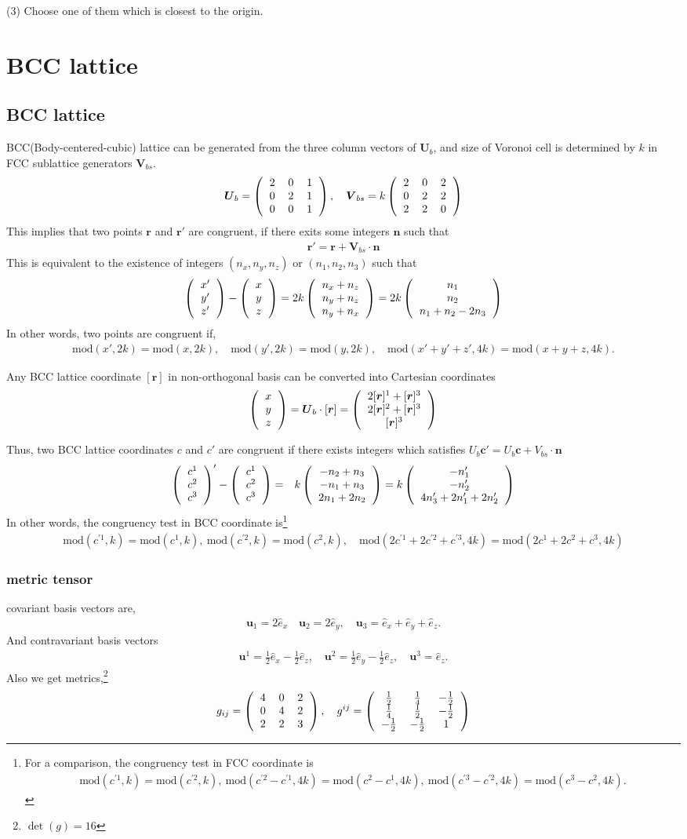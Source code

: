 \documentclass[10pt]{book}
\def\bm{\boldsymbol}
\newcommand{\bea}{\begin{eqnarray}}
\newcommand{\eea}{\end{eqnarray}}
\def\vr{{\bm r}}
\newcommand{\colmthr}[3]
{\left(\begin{tabular}{c} {$#1$}\\{$#2$}\\{$#3$}\end{tabular}\right)}
\newcommand{\threedmat}[9]
{\left(\begin{tabular}{ccc} {$#1$}&{$#2$}&{$#3$} \\
		{$#4$}&{$#5$}&{$#6$}\\
		{$#7$}&{$#8$}&{$#9$}\\
	    \end{tabular}\right)}
\begin{document}
(3) Choose one of them which is closest to the origin. 
 
\chapter{BCC lattice} 

\section{BCC lattice} 
BCC(Body-centered-cubic) lattice 
can be generated from the three column vectors of ${\bm U}_b$, 
and size of Voronoi cell is determined by $k$ in
FCC sublattice generators ${\bm V}_{bs}$.
\bea       
{\bm U}_b=\threedmat{2}{0}{1}{0}{2}{1}{0}{0}{1},\quad {\bm V}_{bs}=k\threedmat{2}{0}{2}{0}{2}{2}{2}{2}{0}
\eea 
This implies that two points 
$\vr$ and $\vr'$ are congruent, 
if there exits some integers ${\bm n}$ such that
\bea 
\vr'=\vr+{\bm V}_{bs}\cdot {\bm n}
\eea 
This is equivalent to the existence of integers $(n_x,n_y,n_z)$ or  $(n_1,n_2,n_3)$ such that 
\bea 
\colmthr{x'}{y'}{z'}-\colmthr{x}{y}{z}= 2k \colmthr{n_x+n_z}{n_y+n_z}{n_y+n_x}=
2k \colmthr{n_1}{n_2}{n_1+n_2-2 n_3}
\eea 
In other words, two points are congruent if,
\bea 
\mbox{mod}(x',2k)=\mbox{mod}(x,2k),\quad 
\mbox{mod}(y',2k)=\mbox{mod}(y,2k),\quad 
\mbox{mod}(x'+y'+z',4k)=\mbox{mod}(x+y+z,4k).\nonumber  
\eea 

Any BCC lattice coordinate $[\vr]$ in non-orthogonal basis
can be converted into Cartesian coordinates 
\bea 
\colmthr{x}{y}{z}={\bm U}_b\cdot[\vr]=\colmthr{2[\vr]^1+[\vr]^3}{2[\vr]^2+[\vr]^3}{[\vr]^3}
\eea 

Thus, two BCC lattice coordinates $c$ and $c'$ are 
	congruent if there exists integers which satisfies
	$U_b{\bm c}'=U_b{\bm c}+V_{bs}\cdot {\bm n}$
	\bea 
	\colmthr{c^1}{c^2}{c^3}'-\colmthr{c^1}{c^2}{c^3} &=& k \colmthr{-n_2+n_3 }{-n_1+n_3 }{2n_1+2n_2 }
	=k \colmthr{-n'_1}{-n'_2}{4n'_3+2n'_1+2n'_2}
	\eea 
	In other words, the congruency test in BCC coordinate is\footnote{ 
		For a comparison, the congruency test in FCC coordinate is
		\bea 
		\mbox{mod}(c^{'1},k)=\mbox{mod}(c^{'2},k),\
		\mbox{mod}(c^{'2}-c^{'1},4k)=\mbox{mod}(c^{2}-c^{1},4k),\
		\mbox{mod}(c^{'3}-c^{'2},4k)=\mbox{mod}(c^{3}-c^{2},4k).
		\eea 
	} 
	\bea 
	\mbox{mod}(c^{'1},k)=\mbox{mod}(c^1,k),\ 
	\mbox{mod}(c^{'2},k)=\mbox{mod}(c^2,k),\quad 
	\mbox{mod}(2c^{'1}+2c^{'2}+c^{'3},4k)=\mbox{mod}(2c^1+2c^2+c^3,4k) \nonumber 
	\eea  

\subsection{metric tensor} 
covariant basis vectors are, 
\bea 
{\bm u}_1=2\hat{e}_x \quad 
{\bm u}_2=2\hat{e}_y ,\quad
{\bm u}_3= \hat{e}_x+\hat{e}_y+\hat{e}_z.
\eea 
And contravariant basis vectors
\bea 
{\bm u}^1=\frac{1}{2}\hat{e}_x-\frac{1}{2}\hat{e}_z,\quad 
{\bm u}^2=\frac{1}{2}\hat{e}_y-\frac{1}{2}\hat{e}_z,\quad 
{\bm u}^3=\hat{e}_z.
\eea 
Also we get metrics,\footnote{$\det(g)=16$}
\bea 
g_{ij}=\threedmat{4}{0}{2}{0}{4}{2}{2}{2}{3},\quad 
g^{ij}=\threedmat{\frac{1}{2}}{\frac{1}{4}}{-\frac{1}{2}}
{\frac{1}{4}}{\frac{1}{2}}{-\frac{1}{2}}
{-\frac{1}{2}}{-\frac{1}{2}}{1}
\eea
\end{document}
